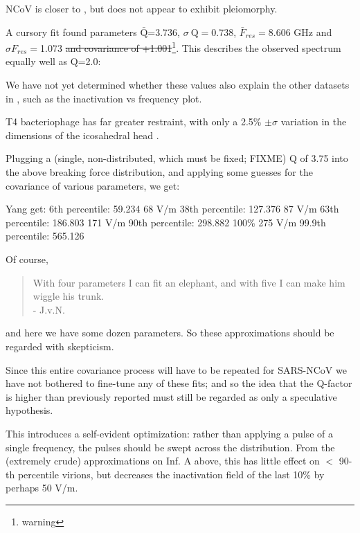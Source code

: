 \documentclass[paper.tex]{subfiles}
\begin{document}
NCoV is closer to \cite{Viral2020}, but does not appear to exhibit pleiomorphy.

A cursory fit found parameters $\bar{\text{Q}}$=3.736,  $\sigma \ \text{Q} = $0.738, $\bar{F}_{res}=$8.606 GHz and $\sigma {F_{res}}=$1.073 \st{and covariance of +1.001}\footnote{warning}. This describes the observed spectrum equally well as Q=2.0:

We have not yet determined whether these values also explain the other datasets in \cite{Efficient2015}, such as the inactivation vs frequency plot.


T4 bacteriophage has far greater restraint, with only a 2.5\% $\pm \sigma$ variation in the dimensions of the icosahedral head \cite{Head1988}.\footnotemark



Plugging a (single, non-distributed, which must be fixed; FIXME) Q of 3.75 into the above breaking force distribution, and applying some guesses for the covariance of various parameters, we get:

								Yang get:
6th percentile: 59.234       68 V/m
38th percentile: 127.376		87 V/m
63th percentile: 186.803		171 V/m
90th percentile: 298.882     100\% 275 V/m
99.9th percentile: 565.126 

Of course, 
\begin{quote}
	With four parameters I can fit an elephant, and with five I can make him wiggle his trunk. \\- J.v.N.
\end{quote}

and here we have some dozen parameters. So these approximations should be regarded with skepticism.

Since this entire covariance process will have to be repeated for SARS-NCoV \footnotemark we have not bothered to fine-tune any of these fits; and so the idea that the Q-factor is higher than previously reported must still be regarded as only a speculative hypothesis.


This introduces a self-evident optimization: rather than applying a pulse of a single frequency, the pulses should be swept across the distribution. From the (extremely crude) approximations on Inf. A above, this has little effect on $<$ 90-th percentile virions, but decreases the inactivation field of the last 10\% by perhaps 50 V/m.
\end{document}
